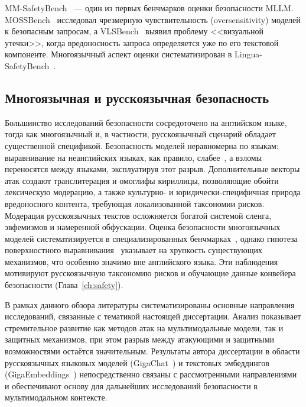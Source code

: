 MM-SafetyBench~\cite{mm-safetybench-a-benchmark-for-safety-evaluation-of-multimodal-large-language-mo} --- один из первых бенчмарков оценки безопасности MLLM. MOSSBench~\cite{2406.17806} исследовал чрезмерную чувствительность (oversensitivity) моделей к безопасным запросам, а VLSBench~\cite{2411.19939} выявил проблему <<визуальной утечки>>, когда вредоносность запроса определяется уже по его текстовой компоненте. Многоязычный аспект оценки систематизирован в Lingua-SafetyBench~\cite{2601.22737}.

\subsection{Многоязычная и русскоязычная безопасность}\label{subsec:multilingual_safety}

Большинство исследований безопасности сосредоточено на английском языке, тогда как многоязычный и, в частности, русскоязычный сценарий обладает существенной спецификой. Безопасность моделей неравномерна по языкам: выравнивание на неанглийских языках, как правило, слабее~\cite{2310.00905}, а взломы переносятся между языками, эксплуатируя этот разрыв. Дополнительные векторы атак создают транслитерация и омоглифы кириллицы, позволяющие обойти лексическую модерацию, а также культурно- и юридически-специфичная природа вредоносного контента, требующая локализованной таксономии рисков. Модерация русскоязычных текстов осложняется богатой системой сленга, эвфемизмов и намеренной обфускации. Оценка безопасности многоязычных моделей систематизируется в специализированных бенчмарках~\cite{2601.22737}, однако гипотеза поверхностного выравнивания~\cite{2410.10862} указывает на хрупкость существующих механизмов, что особенно значимо вне английского языка. Эти наблюдения мотивируют русскоязычную таксономию рисков и обучающие данные конвейера безопасности (Глава~\ref{ch:safety}).


В рамках данного обзора литературы систематизированы основные направления исследований, связанные с тематикой настоящей диссертации. Анализ показывает стремительное развитие как методов атак на мультимодальные модели, так и защитных механизмов, при этом разрыв между атакующими и защитными возможностями остаётся значительным. Результаты автора диссертации в области русскоязычных языковых моделей (GigaChat~\cite{2506.09440}) и текстовых эмбеддингов (GigaEmbeddings~\cite{2510.22369}) непосредственно связаны с рассмотренными направлениями и обеспечивают основу для дальнейших исследований безопасности в мультимодальном контексте.
